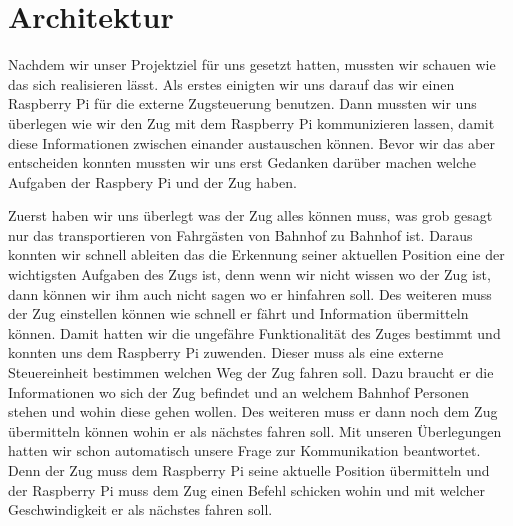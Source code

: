 \chapter{Architektur}
Nachdem wir unser Projektziel für uns gesetzt hatten, mussten wir schauen wie das sich realisieren lässt. Als erstes einigten wir uns darauf das wir einen Raspberry Pi für die externe Zugsteuerung benutzen. Dann mussten wir uns überlegen wie wir den Zug mit dem Raspberry Pi kommunizieren lassen, damit diese Informationen zwischen einander austauschen können. Bevor wir das aber entscheiden konnten mussten wir uns erst Gedanken darüber machen welche Aufgaben der Raspbery Pi und der Zug haben.

Zuerst haben wir uns überlegt was der Zug alles können muss, was grob gesagt nur das transportieren von Fahrgästen von Bahnhof zu Bahnhof ist. Daraus konnten wir schnell ableiten das die Erkennung seiner aktuellen Position eine der wichtigsten Aufgaben des Zugs ist, denn wenn wir nicht wissen wo der Zug ist, dann können wir ihm auch nicht sagen wo er hinfahren soll. Des weiteren muss der Zug einstellen können wie schnell er fährt und Information übermitteln können. Damit hatten wir die ungefähre Funktionalität des Zuges bestimmt und konnten uns dem Raspberry Pi zuwenden. Dieser muss als eine externe Steuereinheit bestimmen welchen Weg der Zug fahren soll. Dazu braucht er die Informationen wo sich der Zug befindet und an welchem Bahnhof Personen stehen und wohin diese gehen wollen. Des weiteren muss er dann noch dem Zug übermitteln können wohin er als nächstes fahren soll. Mit unseren Überlegungen hatten wir schon automatisch unsere Frage zur Kommunikation beantwortet. Denn der Zug muss dem Raspberry Pi seine aktuelle Position übermitteln und der Raspberry Pi muss dem Zug einen Befehl schicken wohin und mit welcher Geschwindigkeit er als nächstes fahren soll. 


